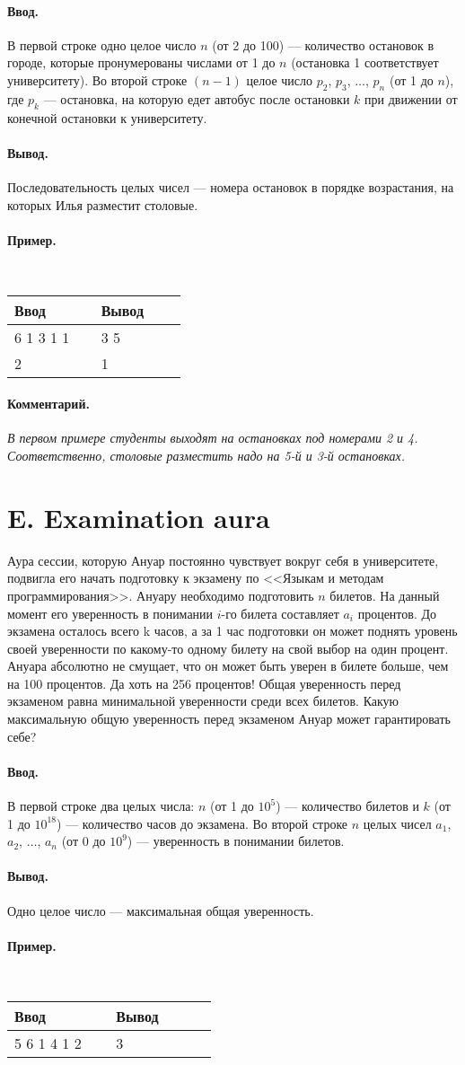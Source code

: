 \documentclass[12pt, a5paper]{article}
\newcommand{\informat}[1]
{
	\paragraph{Ввод.\\} #1
}
\newcommand{\outformat}[1]
{
	\paragraph{Вывод.\\} #1
}
\newcommand{\example}[2]
{
	\paragraph{Пример.\\}
	{\tt
	\begin{tabular}{|p{0.4\linewidth}|p{0.4\linewidth}|}
	\hline
	Ввод & Вывод \\
	\hline
	#1 & #2		\\
	\hline
	\end{tabular}
	}
}
\newcommand{\examplee}[4]
{
	\paragraph{Пример.\\}
	{\tt
	\begin{tabular}{|p{0.4\linewidth}|p{0.4\linewidth}|}
	\hline
	Ввод 	& Вывод  	\\
	\hline
	#1 		& #2 		\\
	\hline
	#3		& #4		\\
	\hline
	\end{tabular}
	}
}
\newcommand{\excomm}[1]
{
	\paragraph{Комментарий. \\}
	\textit{#1}
}
\begin{document}
\informat{В первой строке одно целое число $n$ (от 2 до 100) --- количество остановок в городе, которые пронумерованы числами от 1 до $n$ (остановка 1 соответствует университету). Во второй строке $(n-1)$ целое число $p_2$, $p_3$, $\dots$, $p_n$ (от 1 до $n$), где $p_k$ --- остановка, на которую едет автобус после остановки $k$ при движении от конечной остановки к университету.}
 
\outformat{Последовательность целых чисел --- номера остановок в порядке возрастания, на которых Илья разместит столовые.}

\examplee{6 \newline 5 1 3 1 1}{3 5}{2 \newline 1}{1}

\excomm{В первом примере студенты выходят на остановках под номерами 2 и 4. Соответственно, столовые разместить надо на 5-й и 3-й остановках.}



\section*{E. Examination aura}

Аура сессии, которую Ануар постоянно чувствует вокруг себя в университете, подвигла его начать подготовку к экзамену по <<Языкам и методам программирования>>. Ануару необходимо подготовить $n$ билетов. На данный момент его уверенность в понимании $i$-го билета составляет $a_i$ процентов. До экзамена осталось всего k часов, а за 1 час подготовки он может поднять уровень своей уверенности по какому-то одному билету на свой выбор на один процент. Ануара абсолютно не смущает, что он может быть уверен в билете больше, чем на 100 процентов. Да хоть на 256 процентов! Общая уверенность перед экзаменом равна минимальной уверенности среди всех билетов. Какую максимальную общую уверенность перед экзаменом Ануар может гарантировать себе? 
 
\informat{В первой строке два целых числа: $n$ (от 1 до $10^5$) --- количество билетов и $k$ (от 1 до $10^{18}$) --- количество часов до экзамена. \newline
Во второй строке $n$ целых чисел $a_1$, $a_2$, $\dots$, $a_n$ (от 0 до $10^9$) --- уверенность в понимании билетов.}

\outformat{Одно целое число --- максимальная общая уверенность.}
 
\example{5 6 \newline 5 1 4 1 2}{3}
 
\end{document}
